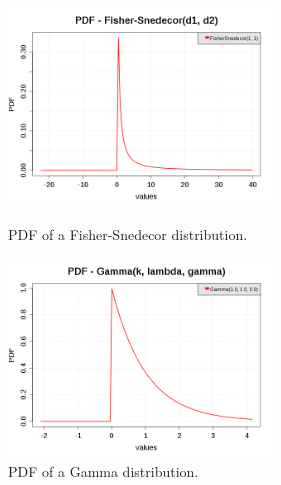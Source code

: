 \begin{figure}[H]
  \begin{minipage}{10cm}
    \begin{center}
      \includegraphics[width=7cm]{pdf_FisherSnedecor_2.png}
      \caption{PDF of a Fisher-Snedecor distribution.}
      \label{PDFFisherSnedecor2}
    \end{center}
  \end{minipage}
  \hfill
  \begin{minipage}{10cm}
    \begin{center}
      \includegraphics[width=7cm]{pdf_Gamma_1.png}
      \caption{PDF of a Gamma distribution.}
      \label{PDFGamma1}
    \end{center}
  \end{minipage}
\end{figure}

